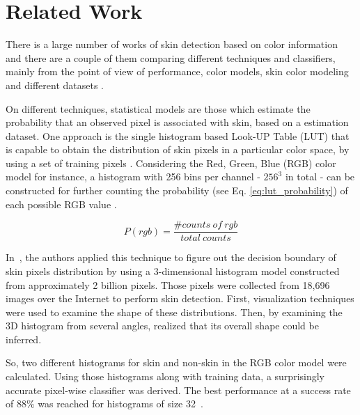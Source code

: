 \chapter{Related Work}
\label{cap:related-work}

There is a large number of works of skin detection based on color information and there are a couple of them comparing different techniques and classifiers, mainly from the point of view of performance, color models, skin color modeling and different datasets \citep{vezhnevets:03,kakumanu:07,mahmoodi:16}.

On different techniques, statistical models are those which estimate the probability that an observed pixel is associated with skin, based on a estimation dataset. One approach is the single histogram based Look-UP Table (LUT) that is capable to obtain the distribution of skin pixels in a particular color space, by using a set of training pixels \citep{mahmoodi:16}. Considering the Red, Green, Blue (RGB) color model for instance, a histogram with 256 bins per channel - $256^3$ in total - can be constructed for further counting the probability (see Eq. \ref{eq:lut_probability}) of each possible RGB value \citep{jones:02}.

\begin{equation*}
    P(rgb) = \frac{\# counts~of~rgb}{total~counts}
    \label{eq:lut_probability}
\end{equation*}

In~\citet{jones:02}, the authors applied this technique to figure out the decision boundary of skin pixels distribution by using a $3$-dimensional histogram model constructed from approximately 2 billion pixels. Those pixels were collected from 18,696 images over the Internet to perform skin detection. First, visualization techniques were used to examine the shape of these distributions. Then, by examining the 3D histogram from several angles, \citet{jones:02} realized that its overall shape could be inferred.

So, two different histograms for skin and non-skin in the RGB color model were calculated. Using those histograms along with training data, a surprisingly accurate pixel-wise classifier was derived. The best performance at a success rate of 88\% was reached for histograms of size 32~\citep{jones:02}.


